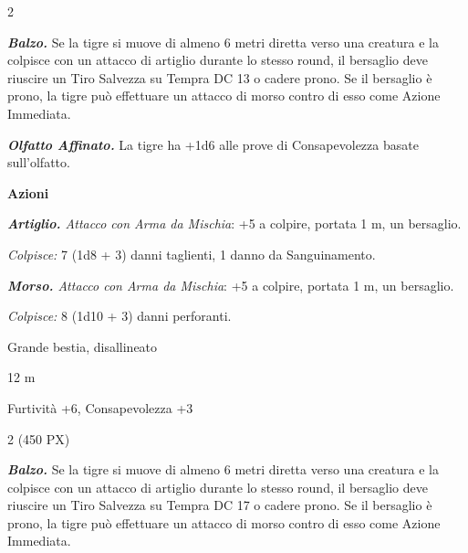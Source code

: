 \begin{multicols}{2}
{\emph{\textbf{Balzo.}} Se la tigre si muove di almeno 6 metri diretta verso una creatura e la colpisce con un attacco di artiglio durante lo stesso round, il bersaglio deve riuscire un Tiro Salvezza su Tempra DC 13 o cadere prono. Se il bersaglio è prono, la tigre può effettuare un attacco di morso contro di esso come Azione Immediata.

\emph{\textbf{Olfatto Affinato.}} La tigre ha +1d6 alle prove di Consapevolezza basate sull'olfatto.

\textbf{Azioni}

\emph{\textbf{Artiglio.} Attacco con Arma da Mischia}: +5 a colpire, portata 1 m, un bersaglio.

\emph{Colpisce:} 7 (1d8 + 3) danni taglienti, 1 danno da Sanguinamento.

\emph{\textbf{Morso.} Attacco con Arma da Mischia}: +5 a colpire, portata 1 m, un bersaglio.

\emph{Colpisce:} 8 (1d10 + 3) danni perforanti.

\label{tigrilla}\hypertarget{Smilodonte}{}\hypertarget{Trigrilla}{}
\begin{description}[noitemsep, topsep=0pt, parsep=0pt, partopsep=0pt, itemsep=1pt, leftmargin=2.35cm,  labelwidth=2.2cm, itemindent=0cm, listparindent=0pt] %
\setlength{\baselineskip}{10pt}
\item[\textbf{Taglia/Tipo}] Grande bestia, disallineato
\item[\textbf{Caratt.}] 
\item[\textbf{Punti Ferita}] 
\item[\textbf{Tiri Salvez.}] 
\item[\textbf{Movimento}] 12 m
\item[\textbf{Comp.}] Furtività +6, Consapevolezza +3
\item[\textbf{Sensi}] 
\item[\textbf{Sfida}] 2 (450 PX)
\end{description}
\smallskip

\emph{\textbf{Balzo.}} Se la tigre si muove di almeno 6 metri diretta verso una creatura e la colpisce con un attacco di artiglio durante lo stesso round, il bersaglio deve riuscire un Tiro Salvezza su Tempra DC 17 o cadere prono. Se il bersaglio è prono, la tigre può effettuare un attacco di morso contro di esso come Azione Immediata.

}
\end{multicols}
